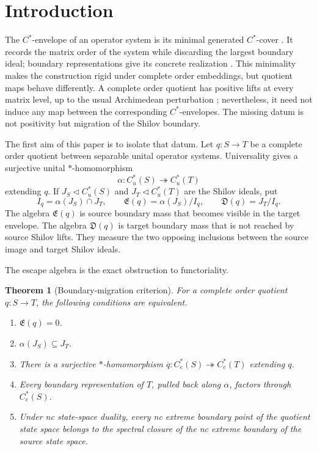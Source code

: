 \documentclass[11pt,a4paper]{amsart}
\theoremstyle{plain}
\newtheorem{theorem}{Theorem}[section]
\theoremstyle{definition}
\newcommand{\Cu}{C_u^*}
\newcommand{\Ce}{C_e^*}
\newcommand{\Esc}{\mathfrak E}
\newcommand{\Def}{\mathfrak D}
\begin{document}
\maketitle

\section{Introduction}\label{sec:introduction}

The $C^*$-envelope of an operator system is its minimal generated $C^*$-cover
\cite{Hamana1979,Paulsen2002}.  It records the matrix order of the system while discarding the
largest boundary ideal; boundary representations give its concrete realization
\cite{DritschelMcCullough2005,Arveson2008}.  This minimality makes the construction rigid under
complete order embeddings, but quotient maps behave differently.  A
complete order quotient has positive lifts at every matrix level, up to the usual Archimedean
perturbation \cite{Han2011,KPTT2013}; nevertheless, it need not induce any map between the
corresponding $C^*$-envelopes.  The missing datum is not positivity but migration of the Shilov
boundary.

The first aim of this paper is to isolate that datum.  Let $q:S\to T$ be a complete order quotient
between separable unital operator systems.  Universality gives a surjective unital
$*$-homomorphism
\[
 \alpha:\Cu(S)\twoheadrightarrow\Cu(T)
\]
extending $q$.  If $J_S\triangleleft\Cu(S)$ and $J_T\triangleleft\Cu(T)$ are the Shilov ideals,
put
\begin{equation}\label{eq:defects-intro}
 I_q=\alpha(J_S)\cap J_T,\qquad
 \Esc(q)=\alpha(J_S)/I_q,\qquad
 \Def(q)=J_T/I_q.
\end{equation}
The algebra $\Esc(q)$ is source boundary mass that becomes visible in the target envelope.
The algebra $\Def(q)$ is target boundary mass that is not reached by source Shilov lifts.
They measure the two opposing inclusions between the source image and target Shilov ideals.

The escape algebra is the exact obstruction to functoriality.

\begin{theorem}[Boundary-migration criterion]\label{thm:intro-escape}
For a complete order quotient $q:S\to T$, the following conditions are equivalent.
\begin{enumerate}[label=\textup{(\roman*)}]
\item $\Esc(q)=0$.
\item $\alpha(J_S)\subseteq J_T$.
\item There is a surjective $*$-homomorphism
      $\overline q:\Ce(S)\twoheadrightarrow\Ce(T)$ extending $q$.
\item Every boundary representation of $T$, pulled back along $\alpha$, factors through
      $\Ce(S)$.
\item Under nc state-space duality, every nc extreme boundary point of the quotient state space
      belongs to the spectral closure of the nc extreme boundary of the source state space.
\end{enumerate}
\end{theorem}
\end{document}
